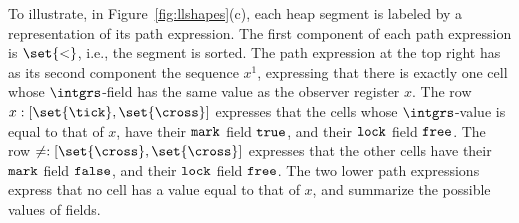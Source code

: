 To illustrate, in
Figure~\ref{fig:llshapes}(c), each heap segment is labeled by
a representation of its path expression. The first component of
each path expression is $\set{<}$, i.e., the segment
is sorted. The path expression at the top right has as its second component
the sequence $x^1$, expressing that there is exactly one cell whose
$\intgrs$-field has the same value as the observer register $x$.
The row $x:[\set{\mbox{\tick}},\set{\mbox{\cross}}]$ expresses
that the cells whose $\intgrs$-value is equal to that of $x$, have
their ${\tt mark}$ field ${\tt true}$, and their ${\tt lock}$ field ${\tt free}$.
The row $\neq:[\set{\mbox{\cross}},\set{\mbox{\cross}}]$ expresses
that the other cells have
their ${\tt mark}$ field ${\tt false}$, and their ${\tt lock}$ field ${\tt free}$.
The two lower path expressions express that no cell has a value equal to
that of $x$, and summarize the possible values of fields.
  

